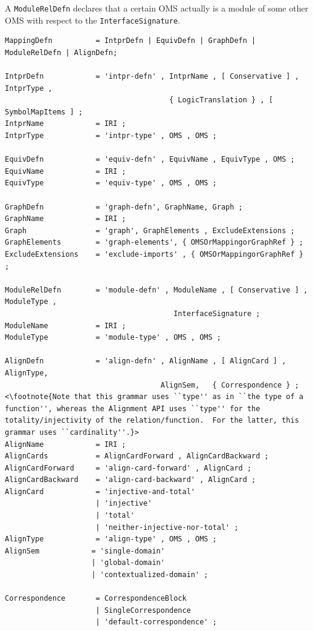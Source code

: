 \documentclass[10pt,%
\ifpretendfinal
final%
\else
draft%
\fi,
]{scrreprt}
\newcommand*{\syntax}[1]{\texttt{#1}}
\begin{document}
A \syntax{ModuleRelDefn} declares that a certain OMS
actually is a module of some other OMS with respect
to the \syntax{InterfaceSignature}.

\begin{lstlisting}[language=ebnf,escapeinside={<>},mathescape]  % abstract syntax
MappingDefn          = IntprDefn | EquivDefn | GraphDefn | ModuleRelDefn | AlignDefn;

IntprDefn            = 'intpr-defn' , IntprName , [ Conservative ] , IntprType ,
                                      { LogicTranslation } , [ SymbolMapItems ] ;
IntprName            = IRI ;
IntprType            = 'intpr-type' , OMS , OMS ;

EquivDefn            = 'equiv-defn' , EquivName , EquivType , OMS ;
EquivName            = IRI ;
EquivType            = 'equiv-type' , OMS , OMS ;

GraphDefn            = 'graph-defn', GraphName, Graph ;
GraphName            = IRI ;
Graph                = 'graph', GraphElements , ExcludeExtensions ;
GraphElements        = 'graph-elements', { OMSOrMappingorGraphRef } ;
ExcludeExtensions    = 'exclude-imports' , { OMSOrMappingorGraphRef } ; 

ModuleRelDefn        = 'module-defn' , ModuleName , [ Conservative ] , ModuleType ,
                                       InterfaceSignature ;
ModuleName           = IRI ;
ModuleType           = 'module-type' , OMS , OMS ;

AlignDefn            = 'align-defn' , AlignName , [ AlignCard ] , AlignType, 
                                    AlignSem,   { Correspondence } ; <\footnote{Note that this grammar uses ``type'' as in ``the type of a function'', whereas the Alignment API uses ``type'' for the totality/injectivity of the relation/function.  For the latter, this grammar uses ``cardinality''.}>
AlignName            = IRI ;
AlignCards           = AlignCardForward , AlignCardBackward ; 
AlignCardForward     = 'align-card-forward' , AlignCard ;
AlignCardBackward    = 'align-card-backward' , AlignCard ;
AlignCard            = 'injective-and-total'
                     | 'injective'
                     | 'total'
                     | 'neither-injective-nor-total' ;
AlignType            = 'align-type' , OMS , OMS ;
AlignSem            = 'single-domain' 
                    | 'global-domain' 
                    | 'contextualized-domain' ; 

Correspondence       = CorrespondenceBlock
                     | SingleCorrespondence
                     | 'default-correspondence' ; 


\end{lstlisting}
\end{document}
